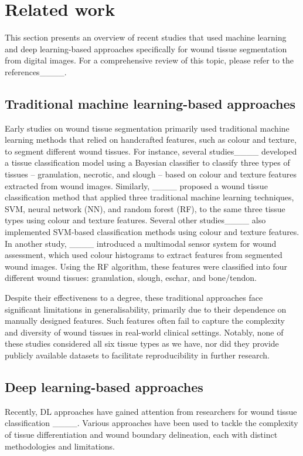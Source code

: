 \section{Related work}
\label{sec:background-study}
This section presents an overview of recent studies that used machine learning and deep learning-based approaches specifically for wound tissue segmentation from digital images. For a comprehensive review of this topic, please refer to the references____.

\subsection{Traditional machine learning-based approaches}
Early studies on wound tissue segmentation primarily used traditional machine learning methods that relied on handcrafted features, such as colour and texture, to segment different wound tissues. For instance, several studies____ developed a tissue classification model using a Bayesian classifier to classify three types of tissues -- granulation, necrotic, and slough -- based on colour and texture features extracted from wound images. Similarly, ____ proposed a wound tissue classification method that applied three traditional machine learning techniques, SVM, neural network (NN), and random forest (RF), to the same three tissue types using colour and texture features. Several other studies____ also implemented SVM-based classification methods using colour and texture features. 
In another study, ____ introduced a multimodal sensor system for wound assessment, which used colour histograms to extract features from segmented wound images. Using the RF algorithm, these features were classified into four different wound tissues: granulation, slough, eschar, and bone/tendon. 

Despite their effectiveness to a degree, these traditional approaches face significant limitations in generalisability, primarily due to their dependence on manually designed features. Such features often fail to capture the complexity and diversity of wound tissues in real-world clinical settings. Notably, none of these studies considered all six tissue types as we have, nor did they provide publicly available datasets to facilitate reproducibility in further research.

\subsection{Deep learning-based approaches}
Recently, DL approaches have gained attention from researchers for wound tissue classification ____. Various approaches have been used to tackle the complexity of tissue differentiation and wound boundary delineation, each with distinct methodologies and limitations.

